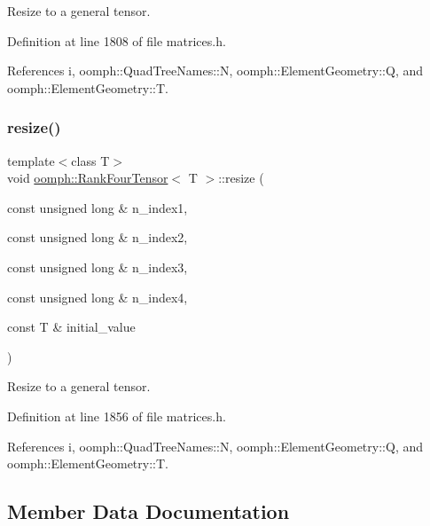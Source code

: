 Resize to a general tensor. 



Definition at line 1808 of file matrices.\+h.



References i, oomph\+::\+Quad\+Tree\+Names\+::N, oomph\+::\+Element\+Geometry\+::Q, and oomph\+::\+Element\+Geometry\+::T.

\mbox{\label{classoomph_1_1RankFourTensor_a26e0b2c9eb50816ec3f30e6bfeb39293}} 
\subsubsection{\texorpdfstring{resize()}{resize()}\hspace{0.1cm}{\footnotesize\ttfamily [3/3]}}
{\footnotesize\ttfamily template$<$class T$>$ \\
void \hyperlink{classoomph_1_1RankFourTensor}{oomph\+::\+Rank\+Four\+Tensor}$<$ T $>$\+::resize (\begin{DoxyParamCaption}\item[{const unsigned long \&}]{n\+\_\+index1,  }\item[{const unsigned long \&}]{n\+\_\+index2,  }\item[{const unsigned long \&}]{n\+\_\+index3,  }\item[{const unsigned long \&}]{n\+\_\+index4,  }\item[{const T \&}]{initial\+\_\+value }\end{DoxyParamCaption})\hspace{0.3cm}{\ttfamily [inline]}}



Resize to a general tensor. 



Definition at line 1856 of file matrices.\+h.



References i, oomph\+::\+Quad\+Tree\+Names\+::N, oomph\+::\+Element\+Geometry\+::Q, and oomph\+::\+Element\+Geometry\+::T.



\subsection{Member Data Documentation}
\mbox{\label{classoomph_1_1RankFourTensor_a0f0e34937940e082dbba6b95383086d5}} 
